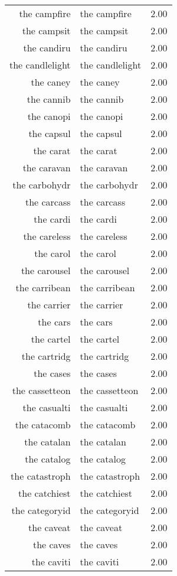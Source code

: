 \begin{table}[ht]
\begin{tabular}{rlr}
  the campfire & the campfire & 2.00 \\ 
  the campsit & the campsit & 2.00 \\ 
  the candiru & the candiru & 2.00 \\ 
  the candlelight & the candlelight & 2.00 \\ 
  the caney & the caney & 2.00 \\ 
  the cannib & the cannib & 2.00 \\ 
  the canopi & the canopi & 2.00 \\ 
  the capsul & the capsul & 2.00 \\ 
  the carat & the carat & 2.00 \\ 
  the caravan & the caravan & 2.00 \\ 
  the carbohydr & the carbohydr & 2.00 \\ 
  the carcass & the carcass & 2.00 \\ 
  the cardi & the cardi & 2.00 \\ 
  the careless & the careless & 2.00 \\ 
  the carol & the carol & 2.00 \\ 
  the carousel & the carousel & 2.00 \\ 
  the carribean & the carribean & 2.00 \\ 
  the carrier & the carrier & 2.00 \\ 
  the cars & the cars & 2.00 \\ 
  the cartel & the cartel & 2.00 \\ 
  the cartridg & the cartridg & 2.00 \\ 
  the cases & the cases & 2.00 \\ 
  the cassetteon & the cassetteon & 2.00 \\ 
  the casualti & the casualti & 2.00 \\ 
  the catacomb & the catacomb & 2.00 \\ 
  the catalan & the catalan & 2.00 \\ 
  the catalog & the catalog & 2.00 \\ 
  the catastroph & the catastroph & 2.00 \\ 
  the catchiest & the catchiest & 2.00 \\ 
  the categoryid & the categoryid & 2.00 \\ 
  the caveat & the caveat & 2.00 \\ 
  the caves & the caves & 2.00 \\ 
  the caviti & the caviti & 2.00 \\ 

\end{tabular}
\end{table}
